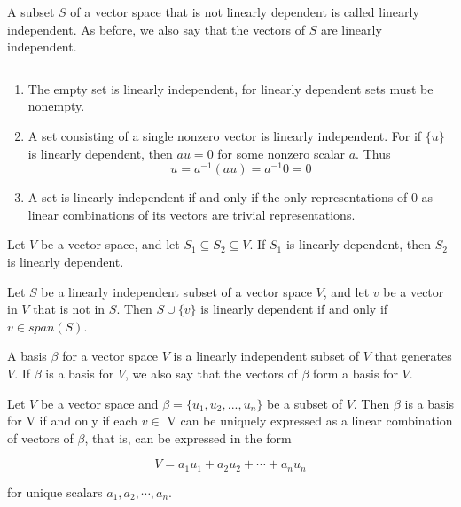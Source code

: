 \begin{defn}
	A subset $S$ of a vector space that is not linearly dependent is called linearly independent. As before, we also say that the vectors of $S$ are linearly independent.
\end{defn}

\begin{rmk*}$ $
	\begin{enumerate}
		\item The empty set is linearly independent, for linearly dependent sets must be nonempty.
		\item A set consisting of a single nonzero vector is linearly independent. For if $\{u\}$ is linearly dependent, then $au = 0$ for some nonzero scalar $a$. Thus
			$$ u = a^{-1}(au) = a^{-1} 0 = 0 $$
		\item A set is linearly independent if and only if the only representations of $0$ as linear combinations of its vectors are trivial representations.
	\end{enumerate}
\end{rmk*}

\begin{thm}
	Let $V$ be a vector space, and let $S_1 \subseteq S_2 \subseteq V$. If $S_1$ is linearly dependent, then $S_2$ is linearly dependent.
\end{thm}

\begin{cor}
	Let $S$ be a linearly independent subset of a vector space $V$, and let $v$ be a vector in $V$ that is not in $S$. Then $S \cup \{v\}$ is linearly dependent if and only if $v \in span(S)$.
\end{cor}

\begin{defn}[Basis]
A basis $\beta$ for a vector space $V$ is a linearly independent subset of $V$ that generates $V$. If $\beta$ is a basis for $V$, we also say that the vectors of $\beta$ form a basis for $V$.
		
\end{defn}

\begin{thm}
	Let $V$ be a vector space and $\beta = \{u_1,u_2,...,u_n \}$ be a subset of $V$. Then $\beta$ is a basis for V if and only if each  $v\in$ V can be uniquely expressed as a linear combination of vectors of $\beta$, that is, can be expressed in the form

	$$ V = a_1u_1 + a_2u_2 + \cdots+ a_nu_n $$

for unique scalars $a_1, a_2, \cdots , a_n$.	
\end{thm}

